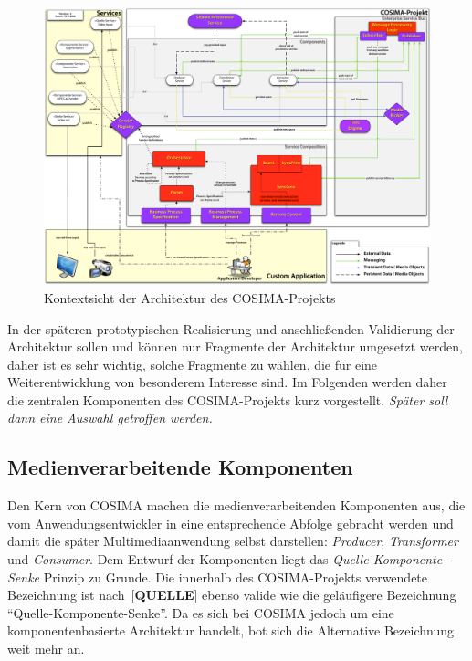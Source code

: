 \begin{figure}[ht]
  \centering
    \includegraphics[width=.9\textwidth]{images/Kontextsicht_Architektur_COSIMA}
  \caption{Kontextsicht der Architektur des COSIMA-Projekts}
  \label{fig:images_Kontextsicht_Architektur_COSIMA}
\end{figure}

  In der späteren prototypischen Realisierung und anschließenden Validierung der Architektur sollen und können nur Fragmente der Architektur umgesetzt werden, daher ist es sehr wichtig, solche Fragmente zu wählen, die für eine Weiterentwicklung von besonderem Interesse sind. Im Folgenden werden daher die zentralen Komponenten des COSIMA-Projekts kurz vorgestellt. \emph{Später soll dann eine Auswahl getroffen werden.}



\subsection{Medienverarbeitende Komponenten} %
\label{sub:medienverarbeitende_komponenten}

  Den Kern von COSIMA machen die medienverarbeitenden Komponenten aus, die vom Anwendungsentwickler in eine entsprechende Abfolge gebracht werden und damit die später Multimediaanwendung selbst darstellen: \emph{Producer}, \emph{Transformer} und \emph{Consumer}. Dem Entwurf der Komponenten liegt das \emph{Quelle-Komponente-Senke} Prinzip zu Grunde. Die innerhalb des COSIMA-Projekts verwendete Bezeichnung ist nach~[\textbf{QUELLE}] ebenso valide wie die geläufigere Bezeichnung "`Quelle-Komponente-Senke"'. Da es sich bei COSIMA jedoch um eine komponentenbasierte Architektur handelt, bot sich die Alternative Bezeichnung weit mehr an.
  
